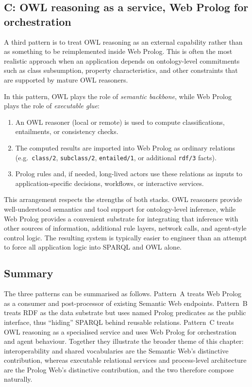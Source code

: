 \subsection{C: OWL reasoning as a service, Web Prolog for orchestration}\label{sec:pattern-owl-as-service}

A third pattern is to treat OWL reasoning as an external capability rather than as something to be reimplemented inside Web Prolog. This is often the most realistic approach when an application depends on ontology-level commitments such as class subsumption, property characteristics, and other constraints that are supported by mature OWL reasoners.

In this pattern, OWL plays the role of \emph{semantic backbone}, while Web Prolog plays the role of \emph{executable glue}:

\begin{enumerate}
\item An OWL reasoner (local or remote) is used to compute classifications, entailments, or consistency checks.
\item The computed results are imported into Web Prolog as ordinary relations (e.g.\ \texttt{class/2}, \texttt{subclass/2}, \texttt{entailed/1}, or additional \texttt{rdf/3} facts).
\item Prolog rules and, if needed, long-lived actors use these relations as inputs to application-specific decisions, workflows, or interactive services.
\end{enumerate}

\noindent This arrangement respects the strengths of both stacks. OWL reasoners provide well-understood semantics and tool support for ontology-level inference, while Web Prolog provides a convenient substrate for integrating that inference with other sources of information, additional rule layers, network calls, and agent-style control logic. The resulting system is typically easier to engineer than an attempt to force all application logic into SPARQL and OWL alone.


\subsection{Summary}\label{sec:cooperation-patterns-summary}

The three patterns can be summarised as follows. Pattern~A treats Web Prolog as a consumer and post-processor of existing Semantic Web endpoints. Pattern~B treats RDF as the data substrate but uses named Prolog predicates as the public interface, thus ``hiding'' SPARQL behind reusable relations. Pattern~C treats OWL reasoning as a specialised service and uses Web Prolog for orchestration and agent behaviour. Together they illustrate the broader theme of this chapter: interoperability and shared vocabularies are the Semantic Web's distinctive contribution, whereas executable relational services and process-level architecture are the Prolog Web's distinctive contribution, and the two therefore compose naturally.

